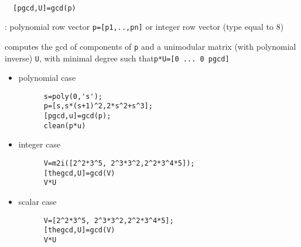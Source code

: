 
\begin{mandesc}
   \\ %
\end{mandesc}
\begin{calling_sequence}
\begin{verbatim}
  [pgcd,U]=gcd(p)  
\end{verbatim}
\end{calling_sequence}
\begin{parameters}
  \begin{varlist}
    : polynomial row vector \verb!p=[p1,..,pn]! or integer row
    vector (type equal to 8)
  \end{varlist}
\end{parameters}
\begin{mandescription}
  computes the gcd  of components of \verb!p! and a unimodular 
  matrix (with polynomial inverse) \verb!U!, with minimal degree such that\verb!p*U=[0 ... 0 pgcd]!
\end{mandescription}
\begin{examples}
  \begin{itemize}
  \item polynomial case
    \begin{Verbatim}
      s=poly(0,'s');
      p=[s,s*(s+1)^2,2*s^2+s^3];
      [pgcd,u]=gcd(p);
      clean(p*u)
    \end{Verbatim}
  \item integer case
    \begin{Verbatim}
      V=m2i([2^2*3^5, 2^3*3^2,2^2*3^4*5]);
      [thegcd,U]=gcd(V)
      V*U
    \end{Verbatim}
  \item scalar case
    \begin{Verbatim}
      V=[2^2*3^5, 2^3*3^2,2^2*3^4*5];
      [thegcd,U]=gcd(V)
      V*U
    \end{Verbatim}
  \end{itemize}
\end{examples}
\begin{manseealso}
      
\end{manseealso}
